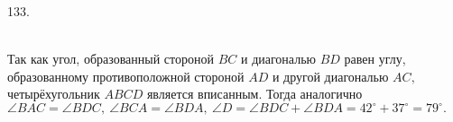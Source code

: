 133. \begin{figure}[ht!]
\end{figure}\\
Так как угол, образованный стороной $BC$ и диагональю $BD$ равен углу, образованному противоположной стороной $AD$ и другой диагональю $AC,$ четырёхугольник $ABCD$ является вписанным. Тогда аналогично $\angle BAC=\angle BDC,\ \angle BCA=\angle BDA,\ \angle D=\angle BDC+\angle BDA=42^\circ+37^\circ=79^\circ.$\\
